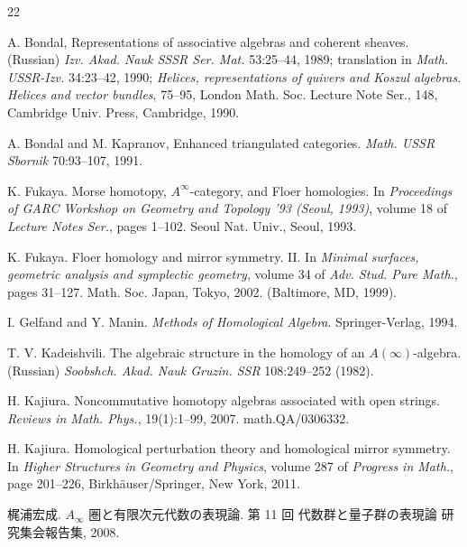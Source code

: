
\begin{thebibliography}{22}

 A. Bondal, Representations of associative algebras and coherent
sheaves. (Russian) \emph{Izv. Akad. Nauk SSSR Ser. Mat.} 53:25--44, 1989;
translation in \emph{Math. USSR-Izv.} 34:23--42, 1990;
\emph{Helices, representations of quivers and Koszul algebras}.
\emph{Helices and vector bundles}, 75--95, London Math. Soc. Lecture Note
Ser., 148, Cambridge Univ. Press, Cambridge, 1990.

 A. Bondal and M. Kapranov, Enhanced triangulated categories.
\emph{Math. USSR Sbornik} 70:93--107, 1991.

 K. Fukaya. Morse homotopy, \(A^{\infty}\)-category, and Floer
homologies. In \emph{Proceedings of GARC Workshop on Geometry and Topology
'93 (Seoul, 1993)}, volume 18 of \emph{Lecture Notes Ser.}, pages 1--102.
Seoul Nat. Univ., Seoul, 1993.

 K. Fukaya. Floer homology and mirror symmetry. II. In
\emph{Minimal surfaces, geometric analysis and symplectic geometry},
volume 34 of \emph{Adv. Stud. Pure Math.}, pages 31--127. Math. Soc. Japan,
Tokyo, 2002. (Baltimore, MD, 1999).

 I. Gelfand and Y. Manin. \emph{Methods of Homological Algebra}.
Springer-Verlag, 1994.

 T. V. Kadeishvili. The algebraic structure in the homology of an
\(A(\infty)\)-algebra. (Russian) \emph{Soobshch. Akad. Nauk Gruzin. SSR}
108:249--252 (1982).

 H. Kajiura. Noncommutative homotopy algebras associated with open
strings. \emph{Reviews in Math. Phys.}, 19(1):1--99, 2007. math.QA/0306332.

 H. Kajiura. Homological perturbation theory and homological mirror
symmetry. In \emph{Higher Structures in Geometry and Physics}, volume 287 of
\emph{Progress in Math.}, page 201--226, Birkhäuser/Springer, New York, 2011.

 梶浦宏成. \(A_{\infty}\) 圏と有限次元代数の表現論.
第 11 回 代数群と量子群の表現論 研究集会報告集, 2008.


\end{thebibliography}
